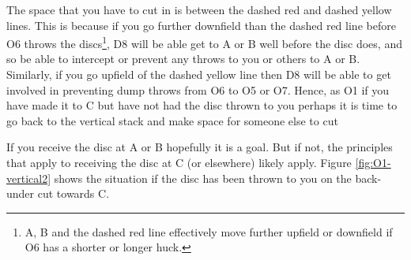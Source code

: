 \documentclass{tufte-handout}
\begin{document}
The space
that you have 
to cut in
is between 
the dashed red 
and dashed yellow lines. 
This is because if you go 
further downfield than the dashed red line 
before O6 throws the discs\footnote{
A, B 
and the dashed red line 
effectively move further upfield
or downfield
if O6 has a shorter or longer huck.},
D8 will be able 
get to
A or B 
well before the disc does, 
and so be able to intercept 
or prevent 
any throws to 
you or others
to A or B. 
Similarly, 
if you go 
upfield of the dashed yellow line
then D8 will be able 
to get involved in 
preventing dump throws from O6
to O5 
or O7.
Hence, as O1 
if you have made it to C
but have not had the disc thrown to you
perhaps it is time to go back to the vertical stack
and make space for someone else to cut




If you receive the disc at A or B hopefully it is a goal. 
But if not, the principles that apply 
to receiving the disc at C 
(or elsewhere) likely apply. Figure \ref{fig:O1-vertical2} shows 
the situation if the disc has been thrown to you
on the back-under cut towards C.
\end{document}
